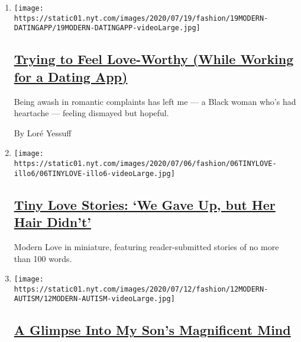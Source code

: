 \begin{enumerate}
\def\labelenumi{\arabic{enumi}.}
\item
  \texttt{[image: https://static01.nyt.com/images/2020/07/19/fashion/19MODERN-DATINGAPP/19MODERN-DATINGAPP-videoLarge.jpg]}

  \hypertarget{trying-to-feel-love-worthy-while-working-for-a-dating-app}{%
  \subsection{\texorpdfstring{\href{/2020/07/17/style/modern-love-feel-love-worthy-working-for-dating-app.html}{Trying
  to Feel Love-Worthy (While Working for a Dating
  App)}}{Trying to Feel Love-Worthy (While Working for a Dating App)}}\label{trying-to-feel-love-worthy-while-working-for-a-dating-app}}

  Being awash in romantic complaints has left me --- a Black woman who's
  had heartache --- feeling dismayed but hopeful.

  By Loré Yessuff
\item
  \texttt{[image: https://static01.nyt.com/images/2020/07/06/fashion/06TINYLOVE-illo6/06TINYLOVE-illo6-videoLarge.jpg]}

  \hypertarget{tiny-love-stories-we-gave-up-but-her-hair-didnt}{%
  \subsection{\texorpdfstring{\href{/2020/07/14/style/tiny-modern-love-stories-coronavirus-we-gave-up-but-her-hair-didnt.html}{Tiny
  Love Stories: `We Gave Up, but Her Hair
  Didn't'}}{Tiny Love Stories: `We Gave Up, but Her Hair Didn't'}}\label{tiny-love-stories-we-gave-up-but-her-hair-didnt}}

  Modern Love in miniature, featuring reader-submitted stories of no
  more than 100 words.
\item
  \texttt{[image: https://static01.nyt.com/images/2020/07/12/fashion/12MODERN-AUTISM/12MODERN-AUTISM-videoLarge.jpg]}

  \hypertarget{a-glimpse-into-my-sons-magnificent-mind}{%
  \subsection{\texorpdfstring{\href{/2020/07/10/style/modern-love-glimpse-into-autistic-sons-magnificent-mind.html}{A
  Glimpse Into My Son's Magnificent
  Mind}}{A Glimpse Into My Son's Magnificent Mind}}\label{a-glimpse-into-my-sons-magnificent-mind}}


\end{enumerate}
